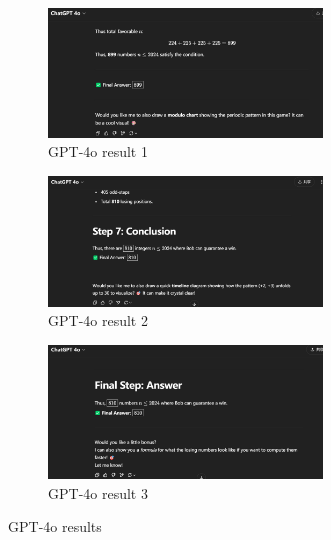 \documentclass[a4paper,12pt]{article}
\begin{document}
\begin{figure}[H]
    \begin{subfigure}[b]{\textwidth}
        \centering
        \includegraphics[width=0.8\textwidth]{figures/4o_1.png}
        \caption{GPT-4o result 1}
        \label{fig:image1}
    \end{subfigure}
    
    \begin{subfigure}[b]{\textwidth}
        \centering
        \includegraphics[width=0.8\textwidth]{figures/4o_2.png}
        \caption{GPT-4o result 2}
        \label{fig:image2}
    \end{subfigure}
    
    \begin{subfigure}[b]{\textwidth}
        \centering
        \includegraphics[width=0.8\textwidth]{figures/4o_3.png}
        \caption{GPT-4o result 3}
        \label{fig:image3}
    \end{subfigure}
    
    \caption{GPT-4o results}
    \label{fig:4o_images}
\end{figure}
\end{document}
